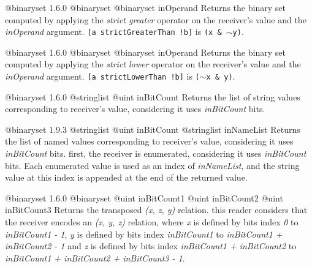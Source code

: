 {@binaryset}
{1.6.0}
{@binaryset}
{@binaryset inOperand}
{Returns the binary set computed by applying the \emph{strict greater} operator on the receiver's value and the \emph{inOperand} argument.}
{\texttt{[a strictGreaterThan !b]} is \texttt{(x \& $\sim$y)}.}







{@binaryset}
{1.6.0}
{@binaryset}
{@binaryset inOperand}
{Returns the binary set computed by applying the \emph{strict lower} operator on the receiver's value and the \emph{inOperand} argument.}
{\texttt{[a strictLowerThan !b]} is \texttt{($\sim$x \& y)}.}







{@binaryset}
{1.6.0}
{@stringlist}
{@uint inBitCount}
{Returns the list of string values corresponding to receiver's value, considering it uses \emph{inBitCount} bits.}
{}







{@binaryset}
{1.9.3}
{@stringlist}
{@uint inBitCount}
{@stringlist inNameList}
{Returns the list of named values corresponding to receiver's value, considering it uses \emph{inBitCount} bits.}
{first, the receiver is enumerated, considering it uses \emph{inBitCount} bits. Each enumerated value is used as an index of \emph{inNameList}, and the string value at this index is appended at the end of the returned value.}







{@binaryset}
{1.6.0}
{@binaryset}
{@uint inBitCount1}
{@uint inBitCount2}
{@uint inBitCount3}
{Returns the transposed \emph{(x, z, y)} relation.}
{this reader considers that the receiver encodes an \emph{(x, y, z)} relation, where \emph{x} is defined by bits index \emph{0} to \emph{inBitCount1  - 1}, \emph{y} is defined by bits index \emph{inBitCount1} to \emph{inBitCount1 + inBitCount2 - 1} and  \emph{z} is defined by bits index \emph{inBitCount1 + inBitCount2} to \emph{inBitCount1 + inBitCount2 + inBitCount3 - 1}.}







